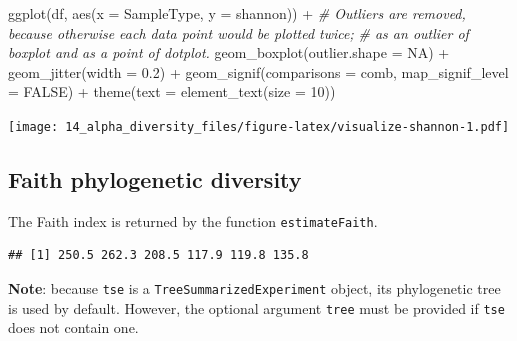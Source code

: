 \documentclass[
]{book}
\newenvironment{Shaded}{\begin{snugshade}}{\end{snugshade}}
\newcommand{\AttributeTok}[1]{\textcolor[rgb]{0.77,0.63,0.00}{#1}}
\newcommand{\CommentTok}[1]{\textcolor[rgb]{0.56,0.35,0.01}{\textit{#1}}}
\newcommand{\ConstantTok}[1]{\textcolor[rgb]{0.00,0.00,0.00}{#1}}
\newcommand{\DecValTok}[1]{\textcolor[rgb]{0.00,0.00,0.81}{#1}}
\newcommand{\FloatTok}[1]{\textcolor[rgb]{0.00,0.00,0.81}{#1}}
\newcommand{\FunctionTok}[1]{\textcolor[rgb]{0.00,0.00,0.00}{#1}}
\newcommand{\NormalTok}[1]{#1}
\newcommand{\OtherTok}[1]{\textcolor[rgb]{0.56,0.35,0.01}{#1}}
\newcommand{\SpecialCharTok}[1]{\textcolor[rgb]{0.00,0.00,0.00}{#1}}
\newcommand{\StringTok}[1]{\textcolor[rgb]{0.31,0.60,0.02}{#1}}
\begin{document}
\begin{Shaded}
\begin{Highlighting}[]
\FunctionTok{ggplot}\NormalTok{(df, }\FunctionTok{aes}\NormalTok{(}\AttributeTok{x =}\NormalTok{ SampleType, }\AttributeTok{y =}\NormalTok{ shannon)) }\SpecialCharTok{+}
  \CommentTok{\# Outliers are removed, because otherwise each data point would be plotted twice; }
  \CommentTok{\# as an outlier of boxplot and as a point of dotplot.}
  \FunctionTok{geom\_boxplot}\NormalTok{(}\AttributeTok{outlier.shape =} \ConstantTok{NA}\NormalTok{) }\SpecialCharTok{+} 
  \FunctionTok{geom\_jitter}\NormalTok{(}\AttributeTok{width =} \FloatTok{0.2}\NormalTok{) }\SpecialCharTok{+} 
  \FunctionTok{geom\_signif}\NormalTok{(}\AttributeTok{comparisons =}\NormalTok{ comb, }\AttributeTok{map\_signif\_level =} \ConstantTok{FALSE}\NormalTok{) }\SpecialCharTok{+}
  \FunctionTok{theme}\NormalTok{(}\AttributeTok{text =} \FunctionTok{element\_text}\NormalTok{(}\AttributeTok{size =} \DecValTok{10}\NormalTok{))}
\end{Highlighting}
\end{Shaded}

\texttt{[image: 14\_alpha\_diversity\_files/figure-latex/visualize-shannon-1.pdf]}

\hypertarget{faith-diversity}{%
\subsection{Faith phylogenetic diversity}\label{faith-diversity}}

The Faith index is returned by the function \texttt{estimateFaith}.

\begin{Shaded}
\end{Shaded}

\begin{verbatim}
## [1] 250.5 262.3 208.5 117.9 119.8 135.8
\end{verbatim}

\textbf{Note}: because \texttt{tse} is a \texttt{TreeSummarizedExperiment} object, its phylogenetic tree is used by default. However, the optional argument \texttt{tree} must be provided if \texttt{tse} does not contain one.
\end{document}
